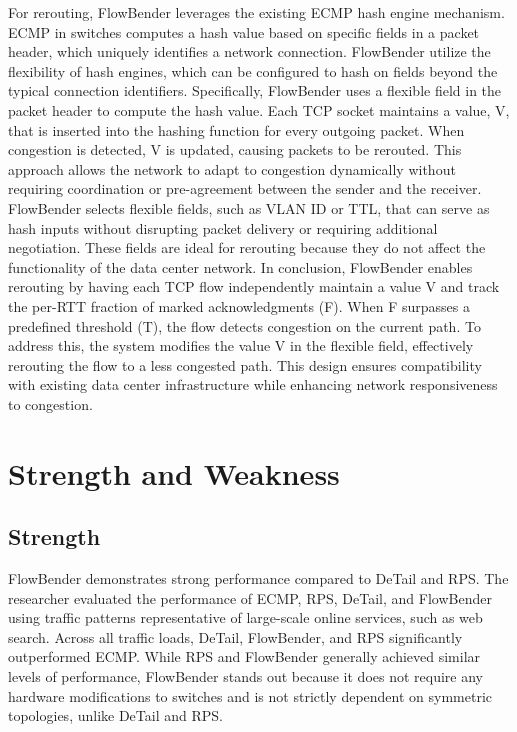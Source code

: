 \documentclass[11pt, sigplan]{acmart}
\begin{document}
For rerouting, FlowBender leverages the existing ECMP hash engine mechanism. ECMP in switches computes a hash value based on specific fields in a packet header, which uniquely identifies a network connection. FlowBender utilize the flexibility of hash engines, which can be configured to hash on fields beyond the typical connection identifiers. Specifically, FlowBender uses a flexible field in the packet header to compute the hash value. Each TCP socket maintains a value, V, that is inserted into the hashing function for every outgoing packet. When congestion is detected, V is updated, causing packets to be rerouted. This approach allows the network to adapt to congestion dynamically without requiring coordination or pre-agreement between the sender and the receiver. FlowBender selects flexible fields, such as VLAN ID or TTL, that can serve as hash inputs without disrupting packet delivery or requiring additional negotiation. These fields are ideal for rerouting because they do not affect the functionality of the data center network. In conclusion, FlowBender enables rerouting by having each TCP flow independently maintain a value V and track the per-RTT fraction of marked acknowledgments (F). When F surpasses a predefined threshold (T), the flow detects congestion on the current path. To address this, the system modifies the value V in the flexible field, effectively rerouting the flow to a less congested path. This design ensures compatibility with existing data center infrastructure while enhancing network responsiveness to congestion.

\section{Strength and Weakness}

\subsection{Strength}
FlowBender demonstrates strong performance compared to DeTail and RPS. The researcher evaluated the performance of ECMP, RPS, DeTail, and FlowBender using traffic patterns representative of large-scale online services, such as web search. Across all traffic loads, DeTail, FlowBender, and RPS significantly outperformed ECMP. While RPS and FlowBender generally achieved similar levels of performance, FlowBender stands out because it does not require any hardware modifications to switches and is not strictly dependent on symmetric topologies, unlike DeTail and RPS.
\end{document}
